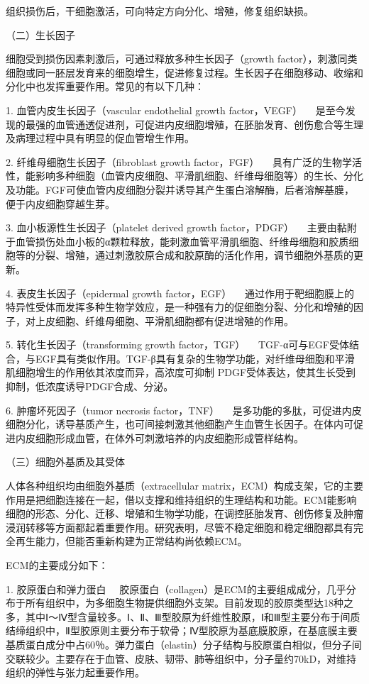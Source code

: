 组织损伤后，干细胞激活，可向特定方向分化、增殖，修复组织缺损。

{（二）生长因子}

细胞受到损伤因素刺激后，可通过释放多种生长因子（growth
factor），刺激同类细胞或同一胚层发育来的细胞增生，促进修复过程。生长因子在细胞移动、收缩和分化中也发挥重要作用。常见的有以下几种：

{1. 血管内皮生长因子（vascular endothelial growth factor，VEGF）}
　是至今发现的最强的血管通透促进剂，可促进内皮细胞增殖，在胚胎发育、创伤愈合等生理及病理过程中具有明显的促血管增生作用。

{2. 纤维母细胞生长因子（fibroblast growth factor，FGF）}
　具有广泛的生物学活性，能影响多种细胞（血管内皮细胞、平滑肌细胞、纤维母细胞等）的生长、分化及功能。FGF可使血管内皮细胞分裂并诱导其产生蛋白溶解酶，后者溶解基膜，便于内皮细胞穿越生芽。

{3. 血小板源性生长因子（platelet derived growth factor，PDGF）}
　主要由黏附于血管损伤处血小板的α颗粒释放，能刺激血管平滑肌细胞、纤维母细胞和胶质细胞等的分裂、增殖，通过刺激胶原合成和胶原酶的活化作用，调节细胞外基质的更新。

{4. 表皮生长因子（epidermal growth factor，EGF）}
　通过作用于靶细胞膜上的特异性受体而发挥多种生物学效应，是一种强有力的促细胞分裂、分化和增殖的因子，对上皮细胞、纤维母细胞、平滑肌细胞都有促进增殖的作用。

{5. 转化生长因子（transforming growth factor，TGF）}
　TGF-α可与EGF受体结合，与EGF具有类似作用。TGF-β具有复杂的生物学功能，对纤维母细胞和平滑肌细胞增生的作用依其浓度而异，高浓度可抑制
PDGF受体表达，使其生长受到抑制，低浓度诱导PDGF合成、分泌。

{6. 肿瘤坏死因子（tumor necrosis factor，TNF）}
　是多功能的多肽，可促进内皮细胞分化，诱导基质产生，也可间接刺激其他细胞产生血管生长因子。在体内可促进内皮细胞形成血管，在体外可刺激培养的内皮细胞形成管样结构。

{（三）细胞外基质及其受体}

人体各种组织均由细胞外基质（extracellular
matrix，ECM）构成支架，它的主要作用是把细胞连接在一起，借以支撑和维持组织的生理结构和功能。ECM能影响细胞的形态、分化、迁移、增殖和生物学功能，在调控胚胎发育、创伤修复及肿瘤浸润转移等方面都起着重要作用。研究表明，尽管不稳定细胞和稳定细胞都具有完全再生能力，但能否重新构建为正常结构尚依赖ECM。

ECM的主要成分如下：

{1. 胶原蛋白和弹力蛋白}
　胶原蛋白（collagen）是ECM的主要组成成分，几乎分布于所有组织中，为多细胞生物提供细胞外支架。目前发现的胶原类型达18种之多，其中Ⅰ～Ⅳ型含量较多。Ⅰ、Ⅱ、Ⅲ型胶原为纤维性胶原，Ⅰ和Ⅲ型主要分布于间质结缔组织中，Ⅱ型胶原则主要分布于软骨；Ⅳ型胶原为基底膜胶原，在基底膜主要基质蛋白成分中占60％。弹力蛋白（elastin）分子结构与胶原蛋白相似，但分子间交联较少。主要存在于血管、皮肤、韧带、肺等组织中，分子量约70kD，对维持组织的弹性与张力起重要作用。

